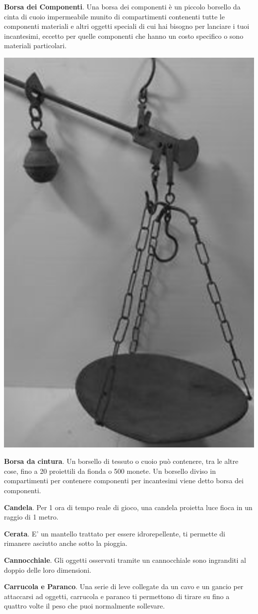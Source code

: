 \begin{multicols}{2}
\textbf{Borsa dei Componenti}\label{Borsa dei Componenti}\hypertarget{Borsa dei Componenti}{}. Una borsa dei componenti è un piccolo borsello da cinta di cuoio impermeabile munito di compartimenti contenenti tutte le componenti materiali e altri oggetti speciali di cui hai bisogno per lanciare i tuoi incantesimi, eccetto per quelle componenti che hanno un costo specifico o sono materiali particolari.

\begin{center}
	\includegraphics[height=0.8\linewidth]{immagini/stadera.png}
\end{center}

\textbf{Borsa da cintura}. Un borsello di tessuto o cuoio può contenere, tra le altre cose, fino a 20 proiettili da fionda o 500 monete. Un borsello diviso in compartimenti per contenere componenti per incantesimi viene detto borsa dei componenti.

\textbf{Candela}\hypertarget{Candela}{}\label{Candela}. Per 1 ora di tempo reale di gioco, una candela proietta luce fioca in un raggio di 1 metro.

\textbf{Cerata}. E' un mantello trattato per essere idrorepellente, ti permette di rimanere asciutto anche sotto la pioggia.

\textbf{Cannocchiale}. Gli oggetti osservati tramite un cannocchiale sono ingranditi al doppio delle loro dimensioni.

\textbf{Carrucola e Paranco}. Una serie di leve collegate da un cavo e un gancio per attaccarsi ad oggetti, carrucola e paranco ti permettono di tirare su fino a quattro volte il peso che puoi normalmente sollevare.\label{Carrucola e Paranco}\hypertarget{Carrucola e paranco}{}


\end{multicols}
